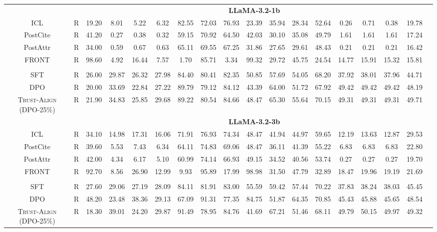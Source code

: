 \documentclass{article} %
\newcommand{\method}[0]{\textsc{Trust-Align}}
\begin{document}
\begin{table}[htb!]
{\begin{tabular}{ccc*{15}c}
& & \multicolumn{15}{c}{\cellcolor[gray]{0.9}\textbf{LLaMA-3.2-1b}} \\
ICL& R & 19.20 & 8.01 & 5.22 & 6.32 & 82.55 & 72.03 & 76.93 & 23.39 & 35.94 & 28.34 & 52.64 & 0.26 & 0.71 & 0.38 & 19.78 \\
PostCite & R & 41.20 & 0.27 & 0.38 & 0.32 & 59.15 & 70.92 & 64.50 & 42.03 & 30.10 & 35.08 & 49.79 & 1.61 & 1.61 & 1.61 & 17.24 \\
PostAttr & R & 34.00 & 0.59 & 0.67 & 0.63 & 65.11 & 69.55 & 67.25 & 31.86 & 27.65 & 29.61 & 48.43 & 0.21 & 0.21 & 0.21 & 16.42 \\
FRONT & R & 98.60 & 4.92 & 16.44 & 7.57 & 1.70 & 85.71 & 3.34 & 99.32 & 29.72 & 45.75 & 24.54 & 14.77 & 15.91 & 15.32 & 15.81 \\\\

SFT& R & 26.00 & 29.87 & 26.32 & 27.98 & 84.40 & 80.41 & 82.35 & 50.85 & 57.69 & 54.05 & 68.20 & 37.92 & 38.01 & 37.96 & 44.71 \\
DPO& R & 20.00 & 33.69 & 22.84 & 27.22 & 89.79 & 79.12 & 84.12 & 43.39 & 64.00 & 51.72 & 67.92 & 49.42 & 49.42 & 49.42 & 48.19 \\
\method{} (DPO-25\%) & R & 21.90 & 34.83 & 25.85 & 29.68 & 89.22 & 80.54 & 84.66 & 48.47 & 65.30 & 55.64 & 70.15 & 49.31 & 49.31 & 49.31 & 49.71 \\

& & \multicolumn{15}{c}{\cellcolor[gray]{0.9}\textbf{LLaMA-3.2-3b}} \\
 ICL& R & 34.10 & 14.98 & 17.31 & 16.06 & 71.91 & 76.93 & 74.34 & 48.47 & 41.94 & 44.97 & 59.65 & 12.19 & 13.63 & 12.87 & 29.53 \\
 PostCite & R & 39.60 & 5.53 & 7.43 & 6.34 & 64.11 & 74.83 & 69.06 & 48.47 & 36.11 & 41.39 & 55.22 & 6.83 & 6.83 & 6.83 & 22.80 \\
PostAttr & R & 42.00 & 4.34 & 6.17 & 5.10 & 60.99 & 74.14 & 66.93 & 49.15 & 34.52 & 40.56 & 53.74 & 0.27 & 0.27 & 0.27 & 19.70 \\
FRONT & R & 92.70 & 8.56 & 26.90 & 12.99 & 9.93 & 95.89 & 17.99 & 98.98 & 31.50 & 47.79 & 32.89 & 18.47 & 19.96 & 19.19 & 21.69 \\\\
 
SFT& R & 27.60 & 29.06 & 27.19 & 28.09 & 84.11 & 81.91 & 83.00 & 55.59 & 59.42 & 57.44 & 70.22 & 37.83 & 38.24 & 38.03 & 45.45 \\
DPO& R & 48.20 & 23.48 & 38.36 & 29.13 & 67.09 & 91.31 & 77.35 & 84.75 & 51.87 & 64.35 & 70.85 & 45.43 & 45.88 & 45.65 & 48.54 \\
\method{} (DPO-25\%) & R & 18.30 & 39.01 & 24.20 & 29.87 & 91.49 & 78.95 & 84.76 & 41.69 & 67.21 & 51.46 & 68.11 & 49.79 & 50.15 & 49.97 & 49.32 \\


\end{tabular}}
\end{table}
\end{document}
